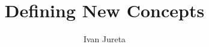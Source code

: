 \documentclass[graybox,envcountchap,sectrefs]{svmono}
\begin{document}
\author{Ivan Jureta}
\title{Defining New Concepts}
\subtitle{}
\maketitle

\frontmatter%

%
%
%
%

\tableofcontents

%


\mainmatter%
%


%
%
%
% 
%
%
%
%
%




%

\backmatter%
%
%
\printindex

\end{document}
